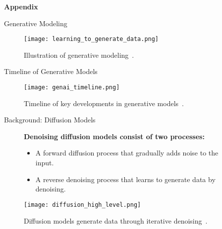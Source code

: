 \begin{refsection}
  \begin{frame}[plain]
    \vfill
    \centering
    {\Huge \textbf{Appendix}}
    \vfill
  \end{frame}
\end{refsection}

\begin{refsection}
  \begin{frame}{Generative Modeling}
    \begin{figure}
      \centering
      \texttt{[image: learning\_to\_generate\_data.png]}
      \caption{\scriptsize Illustration of generative modeling~\parencite{CVPR2023Tutorial}.}
    \end{figure}
    \bottomleftrefs
  \end{frame}
  \end{refsection}
  
  \begin{refsection}
  \begin{frame}{Timeline of Generative Models}
    \begin{figure}
      \centering
      \texttt{[image: genai\_timeline.png]}
      \caption{\scriptsize Timeline of key developments in generative models~\parencite{dengPPTAdvancedNueralNetwork2024}.}
    \end{figure}
    \bottomleftrefs
  \end{frame}
  \end{refsection}
  
  
  
  \begin{refsection}
  \begin{frame}{Background: Diffusion Models}
  
    \begin{figure}
      \begin{minipage}{0.95\linewidth}
        \footnotesize
        \textbf{Denoising diffusion models consist of two processes:}
        \begin{itemize}
          \item A forward diffusion process that gradually adds noise to the input.
          \item A reverse denoising process that learns to generate data by denoising.
        \end{itemize}
      \end{minipage}
      \vspace{2em}
  
      \centering
      \texttt{[image: diffusion\_high\_level.png]}
  
      \caption[]{\scriptsize Diffusion models generate data through iterative denoising~\parencite{sohl2015deep,ho2020denoising}.}
    \end{figure}
  
    \bottomleftrefs
  \end{frame}
  \end{refsection}
  
